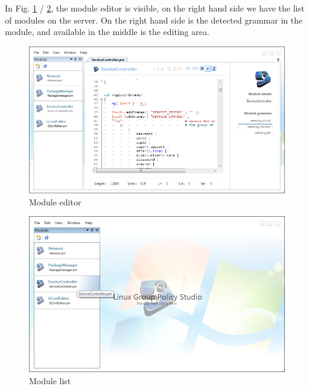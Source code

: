 	\newpage
		
	\normalsize
	{
		In Fig. \ref{fig:SSModuleEditor} / \ref{fig:SSModuleEditor2}, the module editor is visible, on the right hand side we have the list of modules on the server.
		On the right hand side is the detected grammar in the module, and available in the middle is the editing area.
		\newline			
	}		

	\begin{figure}[h!]
		\centering
		\includegraphics[scale=0.65]{pages/appendix3/figures/lgpscreens/moduleed-edit.png}
		\caption{Module editor}
		\label{fig:SSModuleEditor}
	\end{figure}
	
	\begin{figure}[h!]
		\centering
		\includegraphics[scale=0.70]{pages/appendix3/figures/lgpscreens/moduleed-list.png}
		\caption{Module list}
		\label{fig:SSModuleEditor2}
	\end{figure}
	
	\newpage
		
